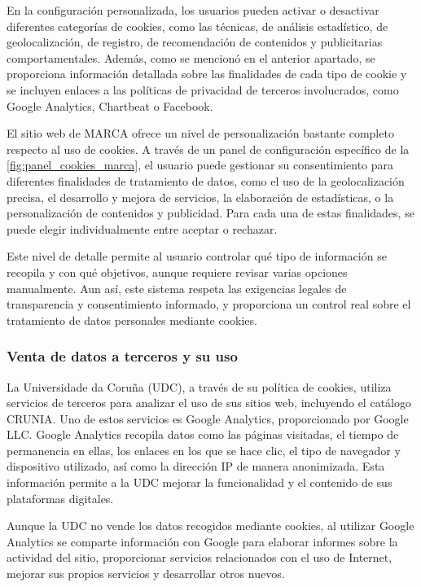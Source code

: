 En la configuración personalizada, los usuarios pueden activar o desactivar diferentes categorías de cookies, como las técnicas, de análisis estadístico, de geolocalización, de registro, de recomendación de contenidos y publicitarias comportamentales. Además, como se mencionó en el anterior apartado, se proporciona información detallada sobre las finalidades de cada tipo de cookie y se incluyen enlaces a las políticas de privacidad de terceros involucrados, como Google Analytics, Chartbeat o Facebook. 


El sitio web de MARCA ofrece un nivel de personalización bastante completo respecto al uso de cookies. A través de un panel de configuración específico de la \ref{fig:panel_cookies_marca}, el usuario puede gestionar su consentimiento para diferentes finalidades de tratamiento de datos, como el uso de la geolocalización precisa, el desarrollo y mejora de servicios, la elaboración de estadísticas, o la personalización de contenidos y publicidad. Para cada una de estas finalidades, se puede elegir individualmente entre aceptar o rechazar. 

Este nivel de detalle permite al usuario controlar qué tipo de información se recopila y con qué objetivos, aunque requiere revisar varias opciones manualmente. Aun así, este sistema respeta las exigencias legales de transparencia y consentimiento informado, y proporciona un control real sobre el tratamiento de datos personales mediante cookies. 


\subsubsection{Venta de datos a terceros y su uso}

La Universidade da Coruña (UDC), a través de su política de cookies, utiliza servicios de terceros para analizar el uso de sus sitios web, incluyendo el catálogo CRUNIA. Uno de estos servicios es Google Analytics, proporcionado por Google LLC. Google Analytics recopila datos como las páginas visitadas, el tiempo de permanencia en ellas, los enlaces en los que se hace clic, el tipo de navegador y dispositivo utilizado, así como la dirección IP de manera anonimizada. Esta información permite a la UDC mejorar la funcionalidad y el contenido de sus plataformas digitales. 

Aunque la UDC no vende los datos recogidos mediante cookies, al utilizar Google Analytics se comparte información con Google para elaborar informes sobre la actividad del sitio, proporcionar servicios relacionados con el uso de Internet, mejorar sus propios servicios y desarrollar otros nuevos. 


